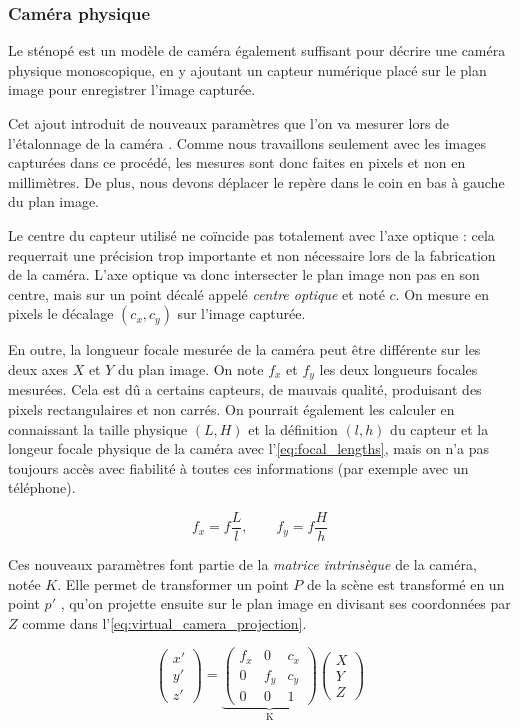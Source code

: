 \subsubsection{Caméra physique}
Le sténopé est un modèle de caméra également suffisant pour décrire une caméra physique monoscopique, en y ajoutant un capteur numérique placé sur le plan image pour enregistrer l'image capturée. 

Cet ajout introduit de nouveaux paramètres que l'on va mesurer lors de l'étalonnage de la caméra . Comme nous travaillons seulement avec les images capturées dans ce procédé, les mesures sont donc faites en pixels et non en millimètres. De plus, nous devons déplacer le repère dans le coin en bas à gauche du plan image.

Le centre du capteur utilisé ne coïncide pas totalement avec l'axe optique : cela requerrait une précision trop importante et non nécessaire lors de la fabrication de la caméra. L'axe optique va donc intersecter le plan image non pas en son centre, mais sur un point décalé appelé \emph{centre optique} et noté $c$. On mesure en pixels le décalage $(c_x,c_y)$ sur l'image capturée.

En outre, la longueur focale mesurée de la caméra peut être différente sur les deux axes $X$ et $Y$ du plan image. On note $f_x$ et $f_y$ les deux longueurs focales mesurées. Cela est dû a certains capteurs, de mauvais qualité, produisant des pixels rectangulaires et non carrés. On pourrait également les calculer en connaissant la taille physique $(L,H)$ et la définition $(l,h)$ du capteur et la longeur focale physique de la caméra avec l'\autoref{eq:focal_lengths}, mais on n'a pas toujours accès avec fiabilité à toutes ces informations (par exemple avec un téléphone).

\begin{equation}
  \label{eq:focal_lengths}
  f_x = f \frac{L}{l},\qquad f_y = f \frac{H}{h}
\end{equation}

Ces nouveaux paramètres font partie de la \emph{matrice intrinsèque} de la caméra, notée $K$. Elle permet de transformer un point $P$ de la scène est transformé en un point $p'$ , qu'on projette ensuite sur le plan image en divisant ses coordonnées par $Z$ comme dans l'\autoref{eq:virtual_camera_projection}.

\begin{equation}
  \label{eq:projection}
  \begin{pmatrix}
    x'\\
    y'\\
    z'
  \end{pmatrix}
  =
  \underbrace{
    \begin{pmatrix}
      f_x & 0 & c_x\\
      0 & f_y & c_y\\
      0 & 0 & 1
    \end{pmatrix}
  }_\text{K}
  \begin{pmatrix}
    X\\
    Y\\
    Z
  \end{pmatrix}
\end{equation}

